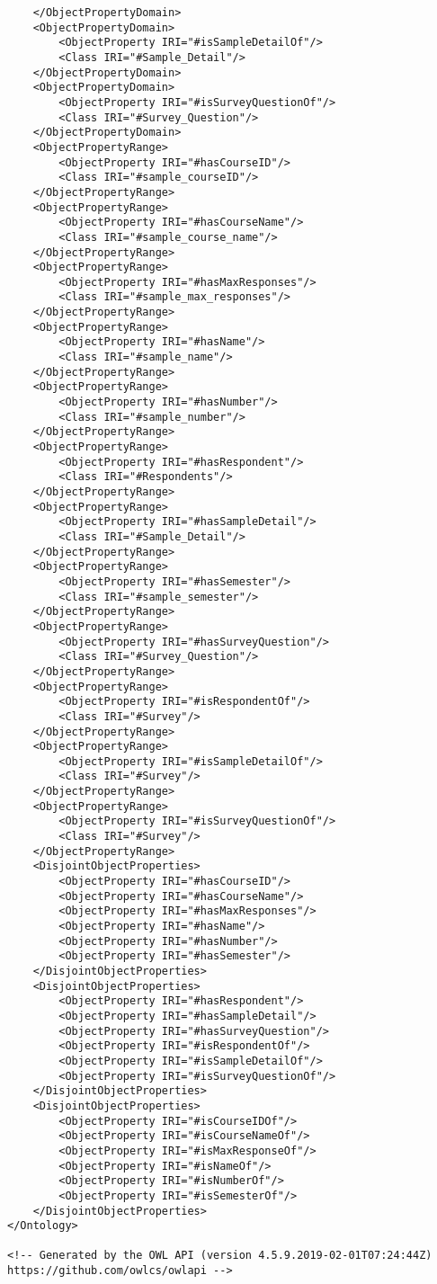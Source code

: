 \begin{lstlisting}
    </ObjectPropertyDomain>
    <ObjectPropertyDomain>
        <ObjectProperty IRI="#isSampleDetailOf"/>
        <Class IRI="#Sample_Detail"/>
    </ObjectPropertyDomain>
    <ObjectPropertyDomain>
        <ObjectProperty IRI="#isSurveyQuestionOf"/>
        <Class IRI="#Survey_Question"/>
    </ObjectPropertyDomain>
    <ObjectPropertyRange>
        <ObjectProperty IRI="#hasCourseID"/>
        <Class IRI="#sample_courseID"/>
    </ObjectPropertyRange>
    <ObjectPropertyRange>
        <ObjectProperty IRI="#hasCourseName"/>
        <Class IRI="#sample_course_name"/>
    </ObjectPropertyRange>
    <ObjectPropertyRange>
        <ObjectProperty IRI="#hasMaxResponses"/>
        <Class IRI="#sample_max_responses"/>
    </ObjectPropertyRange>
    <ObjectPropertyRange>
        <ObjectProperty IRI="#hasName"/>
        <Class IRI="#sample_name"/>
    </ObjectPropertyRange>
    <ObjectPropertyRange>
        <ObjectProperty IRI="#hasNumber"/>
        <Class IRI="#sample_number"/>
    </ObjectPropertyRange>
    <ObjectPropertyRange>
        <ObjectProperty IRI="#hasRespondent"/>
        <Class IRI="#Respondents"/>
    </ObjectPropertyRange>
    <ObjectPropertyRange>
        <ObjectProperty IRI="#hasSampleDetail"/>
        <Class IRI="#Sample_Detail"/>
    </ObjectPropertyRange>
    <ObjectPropertyRange>
        <ObjectProperty IRI="#hasSemester"/>
        <Class IRI="#sample_semester"/>
    </ObjectPropertyRange>
    <ObjectPropertyRange>
        <ObjectProperty IRI="#hasSurveyQuestion"/>
        <Class IRI="#Survey_Question"/>
    </ObjectPropertyRange>
    <ObjectPropertyRange>
        <ObjectProperty IRI="#isRespondentOf"/>
        <Class IRI="#Survey"/>
    </ObjectPropertyRange>
    <ObjectPropertyRange>
        <ObjectProperty IRI="#isSampleDetailOf"/>
        <Class IRI="#Survey"/>
    </ObjectPropertyRange>
    <ObjectPropertyRange>
        <ObjectProperty IRI="#isSurveyQuestionOf"/>
        <Class IRI="#Survey"/>
    </ObjectPropertyRange>
    <DisjointObjectProperties>
        <ObjectProperty IRI="#hasCourseID"/>
        <ObjectProperty IRI="#hasCourseName"/>
        <ObjectProperty IRI="#hasMaxResponses"/>
        <ObjectProperty IRI="#hasName"/>
        <ObjectProperty IRI="#hasNumber"/>
        <ObjectProperty IRI="#hasSemester"/>
    </DisjointObjectProperties>
    <DisjointObjectProperties>
        <ObjectProperty IRI="#hasRespondent"/>
        <ObjectProperty IRI="#hasSampleDetail"/>
        <ObjectProperty IRI="#hasSurveyQuestion"/>
        <ObjectProperty IRI="#isRespondentOf"/>
        <ObjectProperty IRI="#isSampleDetailOf"/>
        <ObjectProperty IRI="#isSurveyQuestionOf"/>
    </DisjointObjectProperties>
    <DisjointObjectProperties>
        <ObjectProperty IRI="#isCourseIDOf"/>
        <ObjectProperty IRI="#isCourseNameOf"/>
        <ObjectProperty IRI="#isMaxResponseOf"/>
        <ObjectProperty IRI="#isNameOf"/>
        <ObjectProperty IRI="#isNumberOf"/>
        <ObjectProperty IRI="#isSemesterOf"/>
    </DisjointObjectProperties>
</Ontology>

<!-- Generated by the OWL API (version 4.5.9.2019-02-01T07:24:44Z)
https://github.com/owlcs/owlapi -->

\end{lstlisting}
